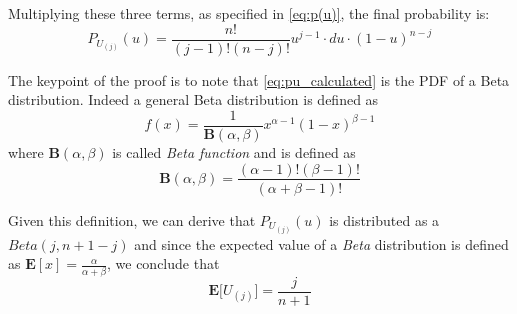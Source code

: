 \documentclass[11pt,a4paper]{article}
\begin{document}
Multiplying these three terms, as specified in \autoref{eq:p(u)}, the final probability is:
\begin{equation}
  \label{eq:pu_calculated}
  P_{U_{(j)}}(u) = \frac{n!}{(j-1)!(n-j)!}u^{j-1}\cdot du \cdot (1-u)^{n-j}
\end{equation}

The keypoint of the proof is to note that \autoref{eq:pu_calculated} is the PDF of a Beta distribution.
Indeed a general Beta distribution is defined as
\begin{equation}
  \label{eq:beta}
  f(x) = \frac{1}{\mathbf{B}(\alpha,\beta)}x^{\alpha-1}(1-x)^{\beta-1}
\end{equation}
where $\mathbf{B}(\alpha,\beta)$ is called \textit{Beta function} and is defined as
\begin{equation}
  \label{eq:beta_func}
  \mathbf{B}(\alpha,\beta) = \frac{(\alpha-1)!(\beta-1)!}{(\alpha+\beta-1)!}
\end{equation}

Given this definition, we can derive that $P_{U_{(j)}}(u)$ is distributed as a $Beta(j,n+1-j)$ and since the expected value of a \textit{Beta} distribution is defined as $\mathbf{E}[x] = \frac{\alpha}{\alpha+\beta}$, we conclude that
\begin{equation}
  \label{eq:ex_value}
  \mathbf{E}\bigg[U_{(j)}\bigg] = \frac{j}{n+1}
\end{equation}

\section{}
\end{document}
